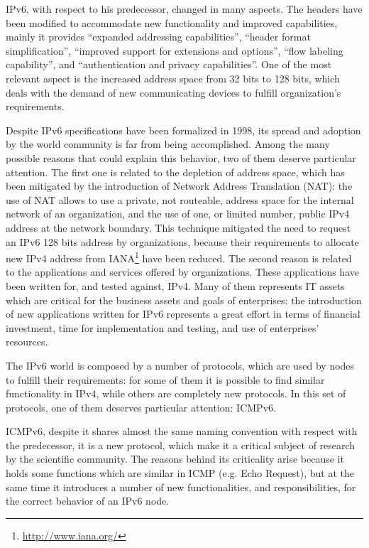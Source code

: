 \documentclass[12pt]{article}
\begin{document}
IPv6\cite{rfc2460}, with respect to his predecessor, changed in many aspects. The headers have been modified to accommodate new functionality and improved capabilities, mainly it provides ``expanded addressing capabilities'', ``header format simplification'', ``improved support for extensions and options'', ``flow labeling capability'', and ``authentication and privacy capabilities''. One of the most relevant aspect is the increased address space from 32 bits to 128 bits, which deals with the demand of new communicating devices to fulfill organization's requirements.

Despite IPv6 specifications have been formalized in 1998, its spread and adoption by the world community is far from being accomplished. Among the many possible reasons that could explain this behavior, two of them deserve particular attention. The first one is related to the depletion of address space, which has been mitigated by the introduction of Network Address Translation (NAT)\cite{rfc3022}: the use of NAT allows to use a private, not routeable, address space for the internal network of an organization, and the use of one, or limited number, public IPv4 address at the network boundary. This technique mitigated the need to request an IPv6 128 bits address by organizations, because their requirements to allocate new IPv4 address from IANA\footnote{\url{http://www.iana.org/}} have been reduced. The second reason is related to the applications and services offered by organizations. These applications have been written for, and tested against, IPv4. Many of them represents IT assets which are critical for the business assets and goals of enterprises: the introduction of new applications written for IPv6 represents a great effort in terms of financial investment, time for implementation and testing, and use of enterprises' resources.

The IPv6 world is composed by a number of protocols, which are used by nodes to fulfill their requirements: for some of them it is possible to find similar functionality in IPv4, while others are completely new protocols. In this set of protocols, one of them deserves particular attention: ICMPv6.

ICMPv6, despite it shares almost the same naming convention with respect with the predecessor, it is a new protocol, which make it a critical subject of research by the scientific community. The reasons behind its criticality arise because it holds some functions which are similar in ICMP (e.g. Echo Request), but at the same time it introduces a number of new functionalities, and responsibilities, for the correct behavior of an IPv6 node.
\end{document}
